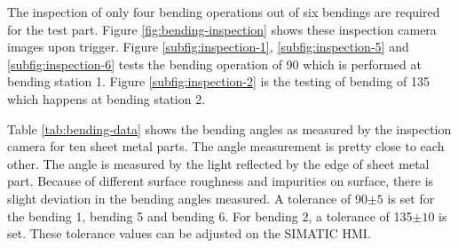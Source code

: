 The inspection of only four bending operations out of six bendings are required for the test part. Figure \ref{fig:bending-inspection} shows these inspection camera images upon trigger. Figure \ref{subfig:inspection-1}, \ref{subfig:inspection-5} and \ref{subfig:inspection-6} tests the bending operation of 90\textdegree{} which is performed at bending station 1. Figure \ref{subfig:inspection-2} is the testing of bending of 135\textdegree{} which happens at bending station 2.

Table \ref{tab:bending-data} shows the bending angles as measured by the inspection camera for ten sheet metal parts. The angle measurement is pretty close to each other. The angle is measured by the light reflected by the edge of sheet metal part. Because of different surface roughness and impurities on surface, there is slight deviation in the bending angles measured. A tolerance of 90$\pm5$\textdegree{} is set for the bending 1, bending 5 and bending 6. For bending 2, a tolerance of 135$\pm10$\textdegree{} is set. These tolerance values can be adjusted on the SIMATIC HMI.

